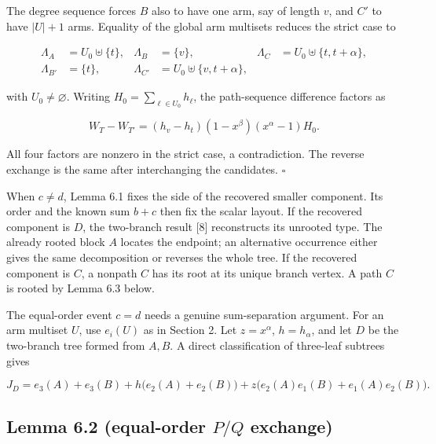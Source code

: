\documentclass[11pt]{article}
\begin{document}
The degree sequence forces $B$ also to have one arm, say of length $v$, and $C'$ to have
$|U|+1$ arms. Equality of the global arm multisets reduces the strict case to

\begin{equation*}
\begin{aligned}
\Lambda_A&=U_0\mathbin{\uplus}\{t\},
&\Lambda_B&=\{v\},
&\Lambda_C&=U_0\mathbin{\uplus}\{t,t+\alpha\},\\
\Lambda_{B'}&=\{t\},
&\Lambda_{C'}&=U_0\mathbin{\uplus}\{v,t+\alpha\},
\end{aligned}
\tag{6.2}
\end{equation*}


with $U_0\neq\varnothing$. Writing $H_0=\sum_{\ell\in U_0}h_\ell$, the path-sequence difference
factors as

\begin{equation*}
W_T-W_{T'}=(h_v-h_t)(1-x^\beta)(x^\alpha-1)H_0.
\tag{6.3}
\end{equation*}


All four factors are nonzero in the strict case, a contradiction. The reverse exchange is the same
after interchanging the candidates. $\square$

When $c\neq d$, Lemma 6.1 fixes the side of the recovered smaller component. Its order and the
known sum $b+c$ then fix the scalar layout. If the recovered component is $D$, the two-branch
result [8] reconstructs its unrooted type. The already rooted block $A$ locates the endpoint; an
alternative occurrence either gives the same decomposition or reverses the whole tree. If the
recovered component is $C$, a nonpath $C$ has its root at its unique branch vertex. A path $C$ is
rooted by Lemma 6.3 below.

The equal-order event $c=d$ needs a genuine sum-separation argument. For an arm multiset $U$, use
$e_i(U)$ as in Section 2. Let $z=x^\alpha$, $h=h_\alpha$, and let $D$ be the two-branch tree formed
from $A,B$. A direct classification of three-leaf subtrees gives

\begin{equation*}
J_D=e_3(A)+e_3(B)+h\bigl(e_2(A)+e_2(B)\bigr)
+z\bigl(e_2(A)e_1(B)+e_1(A)e_2(B)\bigr).
\tag{6.4}
\end{equation*}


\Needspace{0.13\textheight}
\subsection*{Lemma 6.2 (equal-order $P/Q$ exchange)}
\end{document}
